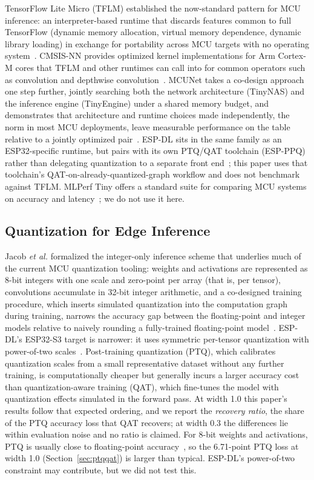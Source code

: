 \documentclass[conference]{IEEEtran}
\begin{document}
	TensorFlow Lite Micro (TFLM) established the now-standard pattern for MCU inference: an
	interpreter-based runtime that discards features common to full TensorFlow (dynamic memory
	allocation, virtual memory dependence, dynamic library loading) in exchange for portability
	across MCU targets with no operating system~\cite{david2021tflm}. CMSIS-NN provides optimized
	kernel implementations for Arm Cortex-M cores that TFLM and other runtimes can call into for
	common operators such as convolution and depthwise
	convolution~\cite{lai2018cmsisnn}. MCUNet takes a co-design approach one step further,
	jointly searching both the network architecture (TinyNAS) and the inference engine
	(TinyEngine) under a shared memory budget, and demonstrates that architecture and runtime
	choices made independently, the norm in most MCU deployments, leave measurable performance
	on the table relative to a jointly optimized pair~\cite{lin2020mcunet}. ESP-DL sits in the same
	family as an ESP32-specific runtime, but pairs with its own PTQ/QAT toolchain
	(ESP-PPQ) rather than delegating quantization to a separate front end~\cite{espdlguide}; this paper uses that
	toolchain's QAT-on-already-quantized-graph workflow and does not benchmark against TFLM. MLPerf Tiny offers a standard suite for comparing MCU systems on accuracy and latency~\cite{banbury2021mlperftiny}; we do not use it here.
	
	\subsection{Quantization for Edge Inference}
	
	Jacob \textit{et al.} formalized the integer-only inference scheme that underlies much of the current
	MCU quantization tooling: weights and activations are represented as 8-bit integers with one
	scale and zero-point per array (that is, per tensor), convolutions accumulate in 32-bit integer
	arithmetic, and a co-designed training procedure, which inserts simulated quantization into the
	computation graph during training, narrows the accuracy gap between the floating-point and
	integer models relative to naively rounding a fully-trained floating-point
	model~\cite{jacob2018quantization}. ESP-DL's ESP32-S3 target is narrower: it uses symmetric per-tensor quantization with power-of-two scales~\cite{espdldocs}. Post-training quantization (PTQ), which calibrates
	quantization scales from a small representative dataset without any further training, is
	computationally cheaper but generally incurs a larger accuracy cost than quantization-aware
	training (QAT), which fine-tunes the model with quantization effects simulated in the forward
	pass. At width 1.0 this paper's results follow that expected ordering, and we report the
	\emph{recovery ratio}, the share of the PTQ accuracy loss that QAT recovers; at width 0.3 the differences lie within evaluation noise and no ratio is claimed. For 8-bit weights and activations, PTQ is usually close to floating-point accuracy~\cite{nagel2021whitepaper}, so the 6.71-point PTQ loss at width 1.0 (Section~\ref{sec:ptqqat}) is larger than typical. ESP-DL's power-of-two constraint may contribute, but we did not test this.
	
\end{document}
